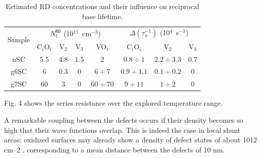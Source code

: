 \documentclass[aip,jap, amsmath,amssymb,reprint]{revtex4-1}
\begin{document}
\begin{table}
\caption{\label{tabIrrad}Estimated RD concentrations and their influence on reciprocal base lifetime.
}
\begin{ruledtabular}
\begin{tabular}{cccccccc}
\multirow{2}{*}{Sample}&\multicolumn{4}{c}{$N_t^\mathtt{RD}$ (10$^{11}$~cm$^{-3}$)}&\multicolumn{3}{c}{$\Delta(\tau_n^{-1})$ (10$^4$~s$^{-1}$)}\\
& C$_i$O$_i$ & V$_2$ & V$_3$ & VO$_i$ & C$_i$O$_i$ & V$_2$ & V$_3$ \\
\hline
nSC&5.5&4.8&1.5&2&$0.8\div1$&$2.2\div3.3$&0.7\\
g6SC&6&0.3&0&$6\div7$&$0.9\div1.1$&$0.1\div0.2$&0\\
g7SC&60&3&0&$60\div70$&$9\div11$&$1\div2$&0\\
\end{tabular}
\end{ruledtabular}
\end{table}



Fig. 4 shows the  series resistance  over the explored temperature range.
\cite{disl10:Isakova,disl10:Trushin,disl10:Kveder,disl10:Castaldini,disl10:Yu}





A remarkable coupling between the
defects occurs if their density becomes so high that their
wave functions overlap. This is indeed the case in local shunt
areas: oxidized surfaces may already show a density of
defect states of about 1012
cm–2
, corresponding to a mean
distance between the defects of 10 nm.
\end{document}
